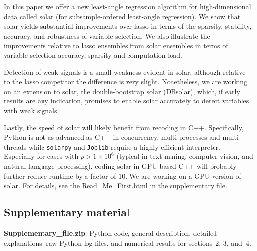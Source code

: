 \documentclass[12pt]{article}
\begin{document}
In this paper we offer a new least-angle regression algorithm for high-dimensional data called solar (for subsample-ordered least-angle regression). We show that solar yields substantial improvements over lasso in terms of the sparsity, stability, accuracy, and robustness of variable selection. We also illustrate the improvements relative to lasso ensembles from solar ensembles in terms of variable selection accuracy, sparsity and computation load.

Detection of weak signals is a small weakness evident in solar, although relative to the lasso competitor the difference is very slight. Nonetheless, we are working on an extension to solar, the double-bootstrap solar (DBsolar), which, if early results are any indication, promises to enable solar accurately to detect variables with weak signals.

Lastly, the speed of solar will likely benefit from recoding in C++. Specifically, Python is not as advanced as C++ in concurrency, multi-processes and multi-threads while \texttt{solarpy} and \texttt{Joblib} require a highly efficient interpreter. Especially for cases with $p>1\times10^6$ (typical in text mining, computer vision, and natural language processing), coding solar in GPU-based C++ will probably further reduce runtime by a factor of $10$. We are working on a GPU version of solar. For details, see the Read\_Me\_First.html in the supplementary file.

\subsection*{Supplementary material}

\noindent
\textbf{Supplementary\_file.zip:} Python code, general description, detailed explanations, raw Python log files, and numerical results for sections~2, 3, and~4.




\end{document}

